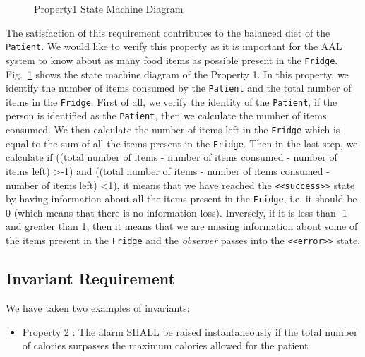 \documentclass[a4paper,twoside]{article}
\begin{document}
\begin{figure}[!h]
  \centering
  {}
  \caption{Property1 State Machine Diagram}
  \label{fig:property1stm}
 \end{figure}
 
The satisfaction of this requirement contributes to the balanced diet of the \texttt{Patient}. We would like to verify this property as it is important for the AAL system to know about as many food items as possible present in the \texttt{Fridge}. Fig.~\ref{fig:property1stm} shows the state machine diagram of the Property 1. In this property, we identify the number of items consumed by the \texttt{Patient} and the total number of items in the \texttt{Fridge}. First of all, we verify the identity of the \texttt{Patient}, if the person is identified as the \texttt{Patient}, then we calculate the number of items consumed. We then calculate the number of items left in the \texttt{Fridge} which is equal to the sum of all the items present in the \texttt{Fridge}. Then in the last step, we calculate if ((total number of items - number of items consumed - number of items left) \textgreater -1) and ((total number of items - number of items consumed - number of items left) \textless 1),
it means that we have reached the \texttt{<<success>>} state by having information about all the items present in the \texttt{Fridge}, i.e. it should be 0 (which means that there is no information loss). Inversely, if it is less than -1 and greater than 1, then it means that we are missing information about some of the items present in the \texttt{Fridge} and the \textit{observer} passes into the \texttt{<<error>>} state.


\subsection{Invariant Requirement}
\noindent We have taken two examples of invariants:

\begin{itemize}
\item Property 2 : The alarm SHALL be raised instantaneously if the total number of calories surpasses the maximum calories allowed for the patient 
\end{itemize}
\end{document}
